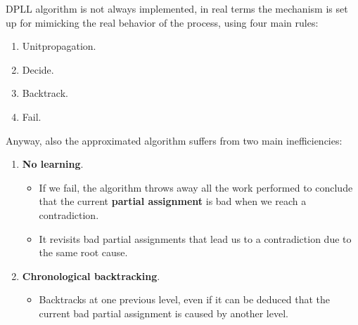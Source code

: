 DPLL algorithm is not always implemented, in real terms the mechanism is set up for mimicking the real behavior of the process, using four main rules:
\begin{enumerate}
    \item Unitpropagation.
    \item Decide.
    \item Backtrack.
    \item Fail.
\end{enumerate} \vspace{7pt}
Anyway, also the approximated algorithm suffers from two main inefficiencies:
\begin{enumerate}
    \item \textbf{No learning}.
    \begin{itemize}
        \renewcommand{\labelitemi}{-}
        \item If we fail, the algorithm throws away all the work performed to conclude that the current \textbf{partial assignment} is bad when we reach a contradiction.
        \item It revisits bad partial assignments that lead us to a contradiction due to the same root cause.
    \end{itemize}
    \item \textbf{Chronological backtracking}.
    \begin{itemize}
        \renewcommand{\labelitemi}{-}
        \item Backtracks at one previous level, even if it can be deduced that the current bad partial assignment is caused by another level.
    \end{itemize}
\end{enumerate}
